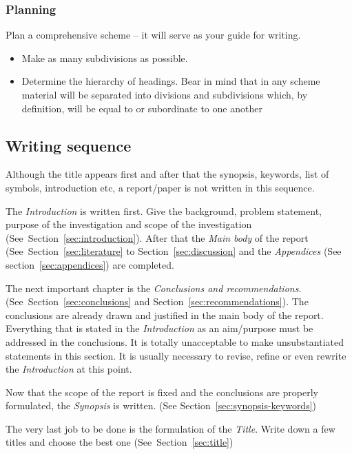 \documentclass[a5paper, 10pt]{article}
\newcommand{\subsectionname}[1]{\emph{#1}}
\begin{document}
\subsubsection{Planning}
Plan a comprehensive scheme -- it will serve as your guide for writing.

\begin{itemize}
\item Make as many subdivisions as possible.
\item Determine the hierarchy of headings.  Bear in mind that in any
  scheme material will be separated into divisions and subdivisions
  which, by definition, will be equal to or subordinate to one another
\end{itemize}

\subsection{Writing sequence}
Although the title appears first and after that the synopsis,
keywords, list of symbols, introduction etc, a report/paper is not
written in this sequence.

The \subsectionname{Introduction} is written first.  Give the background,
problem statement, purpose of the investigation and scope of the
investigation (See~Section~\ref{sec:introduction}).  After that the
\subsectionname{Main body} of the report (See~Section~\ref{sec:literature} to
Section~\ref{sec:discussion} and the \subsectionname{Appendices} (See
section~\ref{sec:appendices}) are completed.

The next important chapter is the \subsectionname{Conclusions and
  recommendations}.  (See~Section~\ref{sec:conclusions} and
Section~\ref{sec:recommendations}).  
The conclusions are already drawn and justified in the main body of the report.
Everything that is stated in the \subsectionname{Introduction} as an aim/purpose must be addressed in the conclusions.
It is totally unacceptable to make unsubstantiated statements in this section.
It is usually necessary to revise, refine or even rewrite the \subsectionname{Introduction} at this point.

Now that the scope of the report is fixed and the conclusions are
properly formulated, the \subsectionname{Synopsis} is written.  (See
Section~\ref{sec:synopsis-keywords})

The very last job to be done is the formulation of
the \subsectionname{Title}.  Write down a few titles and choose the best
one (See~Section~\ref{sec:title})
\end{document}
